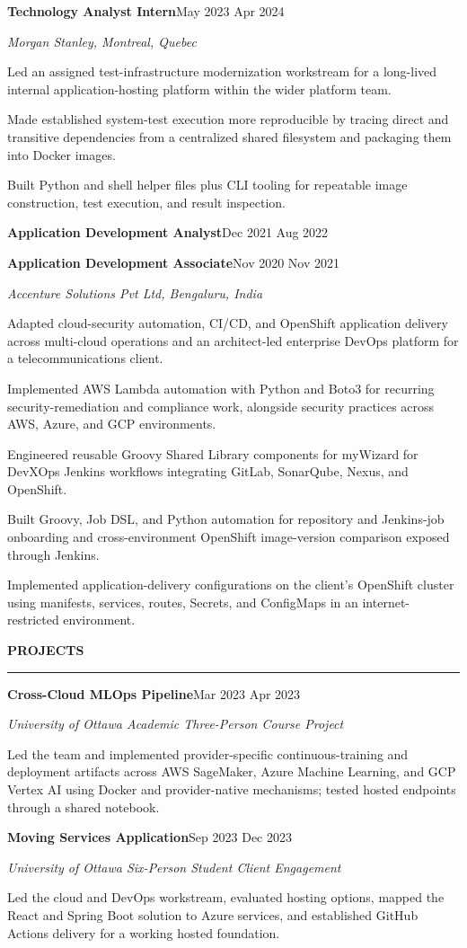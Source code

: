 \documentclass[11pt]{article}
\newcommand{\TwoColLine}[2]{\noindent #1\hfill #2\par}
\newcommand{\ResumeSection}[1]{\vspace{5pt}\begin{center}\textbf{\MakeUppercase{#1}}\\[-4pt]\rule{0.98\textwidth}{0.6pt}\end{center}\vspace{1pt}}
\newcommand{\RoleLine}[2]{\TwoColLine{\textbf{#1}}{#2}}
\newcommand{\OrgLine}[1]{\noindent\textit{#1}\par}
\newcommand{\RoleSummary}[1]{\vspace{1pt}\noindent #1\par\vspace{1pt}}
\newcommand{\EngineeringWorkLabel}{\vspace{1pt}}
\newlength{\BulletIndent}
\newenvironment{ResumeItems}{\begin{list}{\textbullet}{\setlength{\leftmargin}{\BulletIndent}\setlength{\labelwidth}{0.8em}\setlength{\labelsep}{0.5em}\setlength{\itemindent}{0pt}\setlength{\itemsep}{0.5pt}\setlength{\parsep}{0pt}\setlength{\topsep}{0pt}\setlength{\partopsep}{0pt}}}{\par\end{list}}
\newcommand{\PB}[1]{\par\item #1}
\begin{document}
\vspace{3pt}
\RoleLine{Technology Analyst Intern}{May 2023 \textendash{} Apr 2024}
\OrgLine{Morgan Stanley, Montreal, Quebec}
\RoleSummary{Led an assigned test-infrastructure modernization workstream for a
long-lived internal application-hosting platform within the wider platform team.}
\EngineeringWorkLabel
\begin{ResumeItems}
\PB{Made established system-test execution more reproducible by tracing direct and transitive dependencies from a centralized shared filesystem and packaging them into Docker images.}
\PB{Built Python and shell helper files plus CLI tooling for repeatable image construction, test execution, and result inspection.}
\end{ResumeItems}

\vspace{3pt}
\RoleLine{Application Development Analyst}{Dec 2021 \textendash{} Aug 2022}
\RoleLine{Application Development Associate}{Nov 2020 \textendash{} Nov 2021}
\OrgLine{Accenture Solutions Pvt Ltd, Bengaluru, India}
\RoleSummary{Adapted cloud-security automation, CI/CD, and OpenShift application
delivery across multi-cloud operations and an architect-led enterprise DevOps
platform for a telecommunications client.}
\EngineeringWorkLabel
\begin{ResumeItems}
\PB{Implemented AWS Lambda automation with Python and Boto3 for recurring security-remediation and compliance work, alongside security practices across AWS, Azure, and GCP environments.}
\PB{Engineered reusable Groovy Shared Library components for myWizard for DevXOps Jenkins workflows integrating GitLab, SonarQube, Nexus, and OpenShift.}
\PB{Built Groovy, Job DSL, and Python automation for repository and Jenkins-job onboarding and cross-environment OpenShift image-version comparison exposed through Jenkins.}
\PB{Implemented application-delivery configurations on the client's OpenShift cluster using manifests, services, routes, Secrets, and ConfigMaps in an internet-restricted environment.}
\end{ResumeItems}

\ResumeSection{Projects}
\RoleLine{Cross-Cloud MLOps Pipeline}{Mar 2023 \textendash{} Apr 2023}
\OrgLine{University of Ottawa \textemdash{} Academic Three-Person Course Project}
\begin{ResumeItems}
\PB{Led the team and implemented provider-specific continuous-training and deployment artifacts across AWS SageMaker, Azure Machine Learning, and GCP Vertex AI using Docker and provider-native mechanisms; tested hosted endpoints through a shared notebook.}
\end{ResumeItems}
\vspace{2pt}
\RoleLine{Moving Services Application}{Sep 2023 \textendash{} Dec 2023}
\OrgLine{University of Ottawa \textemdash{} Six-Person Student Client Engagement}
\begin{ResumeItems}
\PB{Led the cloud and DevOps workstream, evaluated hosting options, mapped the React and Spring Boot solution to Azure services, and established GitHub Actions delivery for a working hosted foundation.}
\end{ResumeItems}
\end{document}
